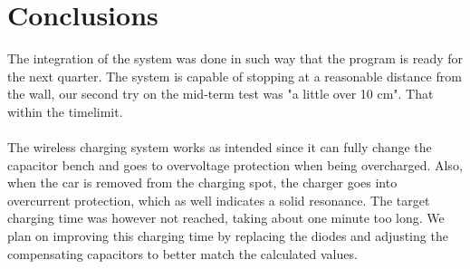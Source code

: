 \documentclass[final]{scrreprt} %
\begin{document}
\chapter{Conclusions}

The integration of the system was done in such way that the program is ready for the next quarter.
The system is capable of stopping at a reasonable distance from the wall, our second try on the mid-term test was "a little over 10 cm".
That within the timelimit.
\\ \\
The wireless charging system works as intended since it can fully change the capacitor bench and goes to overvoltage protection when being overcharged.
Also, when the car is removed from the charging spot, the charger goes into overcurrent protection, which as well indicates a solid resonance.
The target charging time was however not reached, taking about one minute too long.
We plan on improving this charging time by replacing the diodes and adjusting the compensating capacitors to better match the calculated values.
\end{document}
